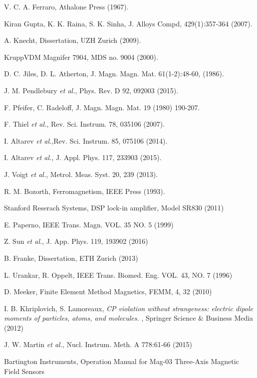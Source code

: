 \documentclass[review]{elsarticle}
\begin{document}
\begin{thebibliography}{00}
 V. C. A. Ferraro, Athalone Press (1967).

 Kiran Gupta, K. K. Raina, S. K. Sinha, J. Alloys Compd, 429(1):357-364 (2007).

 A. Knecht, Dissertation, UZH Zurich (2009).

 KruppVDM Magnifer 7904, MDS no. 9004 (2000).

 D. C. Jiles, D. L. Atherton,  J. Magn. Magn. Mat. 61(1-2):48-60, (1986).

 J. M. Pendlebury {\it et al.}, Phys. Rev. D 92, 092003 (2015).

 F. Pfeifer, C. Radeloff, J. Magn. Magn. Mat. 19 (1980) 190-207.

 F. Thiel {\it et al.}, Rev. Sci. Instrum. 78, 035106 (2007).

 I. Altarev {\it et al.},Rev. Sci. Instrum. 85, 075106 (2014).

 I. Altarev {\it et al.}, J. Appl. Phys. 117, 233903 (2015).

 J. Voigt {\it et al.}, Metrol. Meas. Syst. 20, 239 (2013).

 R. M. Bozorth, Ferromagnetism, IEEE Press (1993).

 Stanford Reserach Systems, DSP lock-in amplifier, Model SR830 (2011)

 E. Paperno, IEEE Trans. Magn. VOL. 35 NO. 5 (1999)

 Z. Sun {\it et al.}, J. App. Phys. 119, 193902 (2016)

 B. Franke, Dissertation, ETH Zurich (2013)

 L. Urankar, R. Oppelt, IEEE Trans. Biomed. Eng. VOL. 43, NO. 7 (1996) 

 D. Meeker, Finite Element Method Magnetics, FEMM, 4, 32 (2010)

 I. B. Khriplovich, S. Lamoreaux, { \it CP violation without strangeness: electric dipole moments of particles, atoms, and molecules. }, Springer Science \& Business Media (2012)

 J. W. Martin {\it et al.}, Nucl. Instrum. Meth. A 778:61-66 (2015) 

 Bartington Instruments, Operation Manual for Mag-03 Three-Axis Magnetic Field Sensors 
\end{thebibliography}
\end{document}
